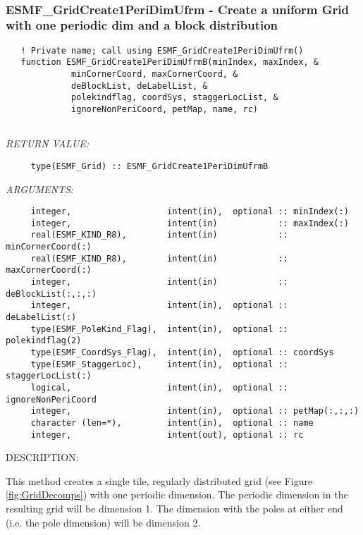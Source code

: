    
 
\mbox{}\hrulefill\ 
 
\subsubsection [ESMF\_GridCreate1PeriDimUfrm] {ESMF\_GridCreate1PeriDimUfrm - Create a uniform Grid with one periodic dim and a block distribution}


 
\begin{verbatim}   ! Private name; call using ESMF_GridCreate1PeriDimUfrm()
   function ESMF_GridCreate1PeriDimUfrmB(minIndex, maxIndex, &
             minCornerCoord, maxCornerCoord, &
             deBlockList, deLabelList, &
             polekindflag, coordSys, staggerLocList, &
             ignoreNonPeriCoord, petMap, name, rc)
 
 \end{verbatim}{\em RETURN VALUE:}
\begin{verbatim}     type(ESMF_Grid) :: ESMF_GridCreate1PeriDimUfrmB\end{verbatim}{\em ARGUMENTS:}
\begin{verbatim}     integer,                   intent(in),  optional :: minIndex(:)
     integer,                   intent(in)            :: maxIndex(:)
     real(ESMF_KIND_R8),        intent(in)            :: minCornerCoord(:)
     real(ESMF_KIND_R8),        intent(in)            :: maxCornerCoord(:)
     integer,                   intent(in)            :: deBlockList(:,:,:)
     integer,                   intent(in),  optional :: deLabelList(:)
     type(ESMF_PoleKind_Flag),  intent(in),  optional :: polekindflag(2)
     type(ESMF_CoordSys_Flag),  intent(in),  optional :: coordSys
     type(ESMF_StaggerLoc),     intent(in),  optional :: staggerLocList(:)
     logical,                   intent(in),  optional :: ignoreNonPeriCoord
     integer,                   intent(in),  optional :: petMap(:,:,:)
     character (len=*),         intent(in),  optional :: name
     integer,                   intent(out), optional :: rc
 \end{verbatim}
{\sf DESCRIPTION:\\ }


  
   This method creates a single tile, regularly distributed grid
   (see Figure \ref{fig:GridDecomps}) with one periodic dimension.
   The periodic dimension in the resulting grid will be dimension 1.
   The dimension with the poles at either end (i.e. the pole dimension)
   will be dimension 2.
  
